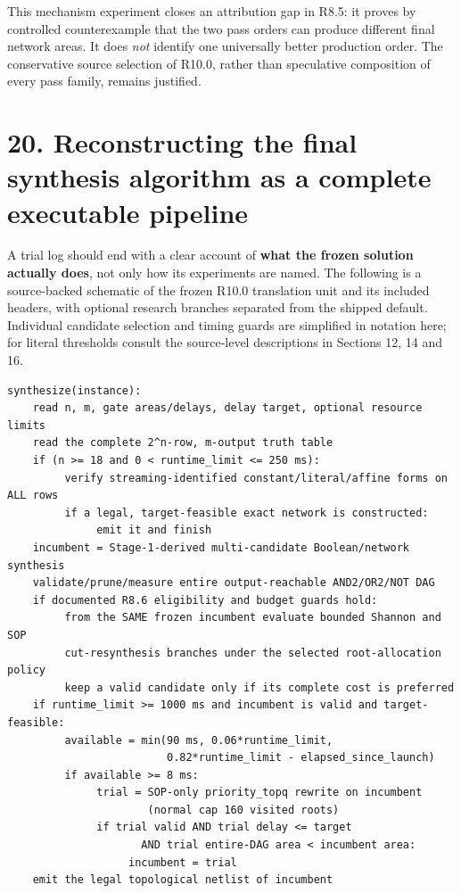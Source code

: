 This mechanism experiment closes an attribution gap in R8.5: it proves by controlled counterexample that the two pass orders can produce different final network areas. It does \emph{not} identify one universally better production order. The conservative source selection of R10.0, rather than speculative composition of every pass family, remains justified.

\section{20. Reconstructing the final synthesis algorithm as a complete executable pipeline}\label{reconstructing-the-final-synthesis-algorithm-as-a-complete-executable-pipeline}

A trial log should end with a clear account of \textbf{what the frozen solution actually does}, not only how its experiments are named. The following is a source-backed schematic of the frozen R10.0 translation unit and its included headers, with optional research branches separated from the shipped default. Individual candidate selection and timing guards are simplified in notation here; for literal thresholds consult the source-level descriptions in Sections 12, 14 and 16.

\begin{verbatim}
synthesize(instance):
    read n, m, gate areas/delays, delay target, optional resource limits
    read the complete 2^n-row, m-output truth table
    if (n >= 18 and 0 < runtime_limit <= 250 ms):
         verify streaming-identified constant/literal/affine forms on ALL rows
         if a legal, target-feasible exact network is constructed:
              emit it and finish
    incumbent = Stage-1-derived multi-candidate Boolean/network synthesis
    validate/prune/measure entire output-reachable AND2/OR2/NOT DAG
    if documented R8.6 eligibility and budget guards hold:
         from the SAME frozen incumbent evaluate bounded Shannon and SOP
         cut-resynthesis branches under the selected root-allocation policy
         keep a valid candidate only if its complete cost is preferred
    if runtime_limit >= 1000 ms and incumbent is valid and target-feasible:
         available = min(90 ms, 0.06*runtime_limit,
                         0.82*runtime_limit - elapsed_since_launch)
         if available >= 8 ms:
              trial = SOP-only priority_topq rewrite on incumbent
                      (normal cap 160 visited roots)
              if trial valid AND trial delay <= target
                     AND trial entire-DAG area < incumbent area:
                   incumbent = trial
    emit the legal topological netlist of incumbent
\end{verbatim}

